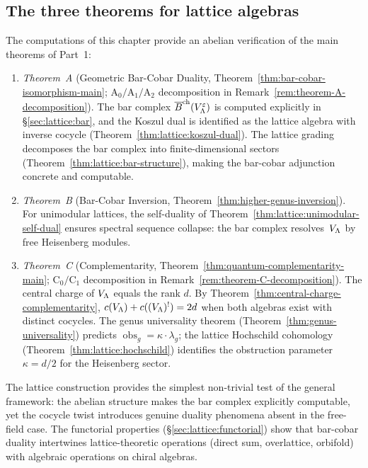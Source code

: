 \subsection{The three theorems for lattice algebras}

\begin{remark}
\label{rem:lattice-three-theorems}
The computations of this chapter provide an abelian verification of the
main theorems of Part~1:

\begin{enumerate}
\item \emph{Theorem~A} (Geometric Bar-Cobar Duality,
  Theorem~\ref{thm:bar-cobar-isomorphism-main};
  $\mathrm{A}_0/\mathrm{A}_1/\mathrm{A}_2$ decomposition in
  Remark~\ref{rem:theorem-A-decomposition}).
  The bar complex $\overline{B}^{\mathrm{ch}}(V_\Lambda^\varepsilon)$
  is computed explicitly in \S\ref{sec:lattice:bar},
  and the Koszul dual is identified as the lattice algebra with
  inverse cocycle (Theorem~\ref{thm:lattice:koszul-dual}).
  The lattice grading decomposes the bar complex into finite-dimensional
  sectors (Theorem~\ref{thm:lattice:bar-structure}), making the
  bar-cobar adjunction concrete and computable.

\item \emph{Theorem~B}
  (Bar-Cobar Inversion,
  Theorem~\ref{thm:higher-genus-inversion}).
  For unimodular lattices, the self-duality of
  Theorem~\ref{thm:lattice:unimodular-self-dual}
  ensures spectral sequence collapse: the bar
  complex resolves~$V_\Lambda$ by free
  Heisenberg modules.

\item \emph{Theorem~C} (Complementarity,
  Theorem~\ref{thm:quantum-complementarity-main};
  $\mathrm{C}_0/\mathrm{C}_1$ decomposition in
  Remark~\ref{rem:theorem-C-decomposition}).
  The central charge of $V_\Lambda$ equals the rank $d$.
  By Theorem~\ref{thm:central-charge-complementarity},
  $c(V_\Lambda) + c((V_\Lambda)^!) = 2d$
  when both algebras exist with distinct cocycles.
  The genus universality theorem
  (Theorem~\ref{thm:genus-universality}) predicts
  $\operatorname{obs}_g = \kappa \cdot \lambda_g$;
  the lattice Hochschild cohomology
  (Theorem~\ref{thm:lattice:hochschild}) identifies the
  obstruction parameter $\kappa = d/2$ for the Heisenberg
  sector.
\end{enumerate}

The lattice construction provides the simplest non-trivial test of the
general framework: the abelian structure makes the bar complex explicitly
computable, yet the cocycle twist introduces genuine duality phenomena
absent in the free-field case.  The functorial properties
(\S\ref{sec:lattice:functorial}) show that bar-cobar duality intertwines
lattice-theoretic operations (direct sum, overlattice, orbifold) with
algebraic operations on chiral algebras.
\end{remark}


